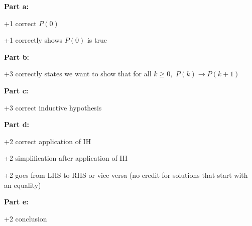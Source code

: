 \documentclass[12pt]{exam}
\begin{document}
\begin{solution}
\textbf{Part a:}
\begin{guidelines}
    \item +1 correct $P(0)$
    \item +1 correctly shows $P(0)$ is true
\end{guidelines}
\textbf{Part b:}
\begin{guidelines}
    \item +3 correctly states we want to show that for all $k\geq 0,$ $P(k)\rightarrow P(k+1)$
\end{guidelines}
\textbf{Part c:}
\begin{guidelines}
    \item +3 correct inductive hypothesis
\end{guidelines}
\textbf{Part d:}
\begin{guidelines}
    \item +2 correct application of IH
    \item +2 simplification after application of IH
    \item +2 goes from LHS to RHS or vice versa (no credit for solutions that start with an equality)
\end{guidelines}
\textbf{Part e:}
\begin{guidelines}
    \item +2 conclusion
\end{guidelines}
\end{solution}
\end{document}
